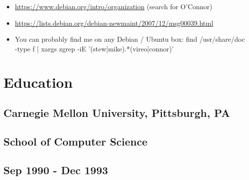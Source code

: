 \documentclass[letterpaper]{article}
\begin{document}
\begin{itemize}
\item \url{https://www.debian.org/intro/organization} (search for O'Connor)
\item \url{https://lists.debian.org/debian-newmaint/2007/12/msg00039.html}
\item You can probably find me on any Debian / Ubuntu box:
find /usr/share/doc -type f | xargs zgrep -iE '(stew|mike).*(vireo|connor)'
\end{itemize}


\section{Education}
\label{sec-4}
\subsection{Carnegie Mellon University, Pittsburgh, PA}
\label{sec-4-1}
\subsection{School of Computer Science}
\label{sec-4-2}
\subsection{Sep 1990 - Dec 1993}
\label{sec-4-3}
\end{document}
